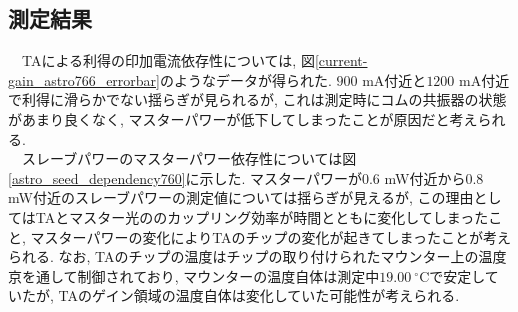 \documentclass[uplatex, dvipdfmx, a4paper, report, papersize, 11pt]{jsbook}
\begin{document}
\subsection{測定結果}
　TAによる利得の印加電流依存性については, 図\ref{current-gain_astro766_errorbar}のようなデータが得られた. $900$ mA付近と$1200$ mA付近で利得に滑らかでない揺らぎが見られるが, これは測定時にコムの共振器の状態があまり良くなく, マスターパワーが低下してしまったことが原因だと考えられる. \\
　スレーブパワーのマスターパワー依存性については図\ref{astro_seed_dependency760}に示した. マスターパワーが$0.6$ mW付近から$0.8$ mW付近のスレーブパワーの測定値については揺らぎが見えるが, この理由としてはTAとマスター光ののカップリング効率が時間とともに変化してしまったこと, マスターパワーの変化によりTAのチップの変化が起きてしまったことが考えられる. なお, TAのチップの温度はチップの取り付けられたマウンター上の温度京を通して制御されており, マウンターの温度自体は測定中$19.00\ ^\circ$Cで安定していたが, TAのゲイン領域の温度自体は変化していた可能性が考えられる.
\end{document}
